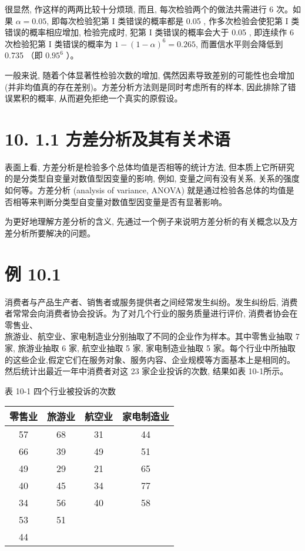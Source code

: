 \documentclass[10pt]{article}
\begin{document}
\begin{CJK*}{UTF8}{bsmi}
很显然, 作这样的两两比较十分烦琐, 而且, 每次检验两个的做法共需进行 6 次。如果 $\alpha=0.05$, 即每次检验犯第 I 类错误的概率都是 0.05 , 作多次检验会使犯第 I 类错误的概率相应增加, 检验完成时, 犯第 I 类错误的概率会大于 0.05 , 即连续作 6 次检验犯第 I 类错误的概率为 $1-(1-\alpha)^{6}=0.265$, 而置信水平则会降低到 0.735 （即 $0.95^{6}$ ）。

一般来说, 随着个体显著性检验次数的增加, 偶然因素导致差别的可能性也会增加 (并非均值真的存在差别)。方差分析方法则是同时考虑所有的样本, 因此排除了错误累积的概率, 从而避免拒绝一个真实的原假设。

\section*{10. 1.1 方差分析及其有关术语}
表面上看, 方差分析是检验多个总体均值是否相等的统计方法, 但本质上它所研究的是分类型自变量对数值型因变量的影响, 例如, 变量之间有没有关系, 关系的强度如何等。方差分析 (analysis of variance, ANOVA) 就是通过检验各总体的均值是否相等来判断分类型自变量对数值型因变量是否有显著影响。

为更好地理解方差分析的含义, 先通过一个例子来说明方差分析的有关概念以及方差分析所要解决的问题。

\section*{例 10.1}
消费者与产品生产者、销售者或服务提供者之间经常发生纠纷。发生纠纷后, 消费者常常会向消费者协会投诉。为了对几个行业的服务质量进行评价, 消费者协会在零售业、\\
旅游业、航空业、家电制造业分别抽取了不同的企业作为样本。其中零售业抽取 7 家, 旅游业抽取 6 家, 航空业抽取 5 家, 家电制造业抽取 5 家。每个行业中所抽取的这些企业,假定它们在服务对象、服务内容、企业规模等方面基本上是相同的。然后统计出最近一年中消费者对这 23 家企业投诉的次数, 结果如表 10-1所示。

表 10-1 四个行业被投诉的次数

\begin{center}
\begin{tabular}{cccc}
\hline
零售业 & 旅游业 & 航空业 & 家电制造业 \\
\hline
57 & 68 & 31 & 44 \\
66 & 39 & 49 & 51 \\
49 & 29 & 21 & 65 \\
40 & 45 & 34 & 77 \\
34 & 56 & 40 & 58 \\
53 & 51 &  &  \\
44 &  &  &  \\
\hline
\end{tabular}
\end{center}


\end{CJK*}
\end{document}
